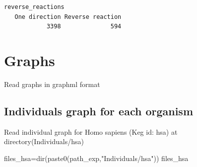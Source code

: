 \documentclass[
  letterpaper,
  DIV=11,
  numbers=noendperiod]{scrreprt}
\newenvironment{Shaded}{\begin{snugshade}}{\end{snugshade}}
\newcommand{\DecValTok}[1]{\textcolor[rgb]{0.68,0.00,0.00}{#1}}
\newcommand{\FunctionTok}[1]{\textcolor[rgb]{0.28,0.35,0.67}{#1}}
\newcommand{\NormalTok}[1]{\textcolor[rgb]{0.00,0.23,0.31}{#1}}
\newcommand{\OtherTok}[1]{\textcolor[rgb]{0.00,0.23,0.31}{#1}}
\newcommand{\SpecialCharTok}[1]{\textcolor[rgb]{0.37,0.37,0.37}{#1}}
\newcommand{\StringTok}[1]{\textcolor[rgb]{0.13,0.47,0.30}{#1}}
\begin{document}
\begin{Shaded}
\end{Shaded}

\begin{verbatim}
reverse_reactions
   One direction Reverse reaction 
            3398              594 
\end{verbatim}


\hypertarget{graphs}{%
\chapter*{Graphs}\label{graphs}}


Read graphs in graphml format

\hypertarget{individuals-graph-for-each-organism}{%
\section*{Individuals graph for each
organism}\label{individuals-graph-for-each-organism}}


Read individual graph for Homo sapiens (Keg id: hsa) at
directory(Individuals/hsa)

\begin{Shaded}
\begin{Highlighting}[]
\NormalTok{files\_hsa}\OtherTok{=}\FunctionTok{dir}\NormalTok{(}\FunctionTok{paste0}\NormalTok{(path\_exp,}\StringTok{"Individuals/hsa"}\NormalTok{))}
\NormalTok{files\_hsa}
\end{Highlighting}
\end{Shaded}
\end{document}
